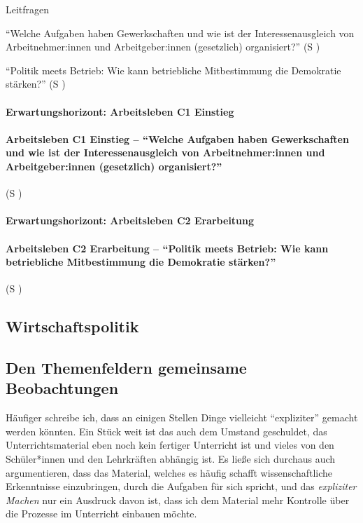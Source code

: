 Leitfragen
\begin{myitemize}
    \item \enquote{Welche Aufgaben haben Gewerkschaften und wie ist der Interessenausgleich von Arbeitnehmer:innen und Arbeitgeber:innen (gesetzlich) organisiert?} (\gls{S} \pageref{ARBEITSLEBEN-C1})
    \item \enquote{Politik meets Betrieb: Wie kann betriebliche Mitbestimmung die Demokratie stärken?} (\gls{S} \pageref{ARBEITSLEBEN-C2})
\end{myitemize}

\paragraph{Erwartungshorizont: Arbeitsleben C1 Einstieg}

\paragraph{Arbeitsleben C1 Einstieg -- \enquote{Welche Aufgaben haben Gewerkschaften und wie ist der Interessenausgleich von Arbeitnehmer:innen und Arbeitgeber:innen (gesetzlich) organisiert?}} (\gls{S} \pageref{ARBEITSLEBEN-C1})



\paragraph{Erwartungshorizont: Arbeitsleben C2 Erarbeitung}

\paragraph{Arbeitsleben C2 Erarbeitung -- \enquote{Politik meets Betrieb: Wie kann betriebliche Mitbestimmung die Demokratie stärken?}} (\gls{S} \pageref{ARBEITSLEBEN-C2})








\subsection{Wirtschaftspolitik} %



\subsection{Den Themenfeldern gemeinsame Beobachtungen}
Häufiger schreibe ich, dass an einigen Stellen Dinge vielleicht \enquote{expliziter} gemacht werden könnten. Ein Stück weit ist das auch dem Umstand geschuldet, das Unterrichtsmaterial eben noch kein fertiger Unterricht ist und vieles von den Schüler*innen und den Lehrkräften abhängig ist. Es ließe sich durchaus auch argumentieren, dass das Material, welches es häufig schafft wissenschaftliche Erkenntnisse einzubringen, durch die Aufgaben für sich spricht, und das \emph{expliziter Machen} nur ein Ausdruck davon ist, dass ich dem Material mehr Kontrolle über die Prozesse im Unterricht einbauen möchte. 


